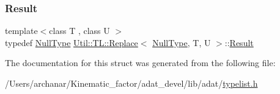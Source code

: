 \mbox{\label{structUtil_1_1TL_1_1Replace_3_01NullType_00_01T_00_01U_01_4_a28b43cf01f62dc72284927d673a7d228}} 
\subsubsection{\texorpdfstring{Result}{Result}\hspace{0.1cm}{\footnotesize\ttfamily [2/2]}}
{\footnotesize\ttfamily template$<$class T , class U $>$ \\
typedef \mbox{\hyperlink{classUtil_1_1NullType}{Null\+Type}} \mbox{\hyperlink{structUtil_1_1TL_1_1Replace}{Util\+::\+T\+L\+::\+Replace}}$<$ \mbox{\hyperlink{classUtil_1_1NullType}{Null\+Type}}, T, U $>$\+::\mbox{\hyperlink{structUtil_1_1TL_1_1Replace_3_01NullType_00_01T_00_01U_01_4_a28b43cf01f62dc72284927d673a7d228}{Result}}}



The documentation for this struct was generated from the following file\+:\begin{DoxyCompactItemize}
\item 
/\+Users/archanar/\+Kinematic\+\_\+factor/adat\+\_\+devel/lib/adat/\mbox{\hyperlink{lib_2adat_2typelist_8h}{typelist.\+h}}\end{DoxyCompactItemize}
